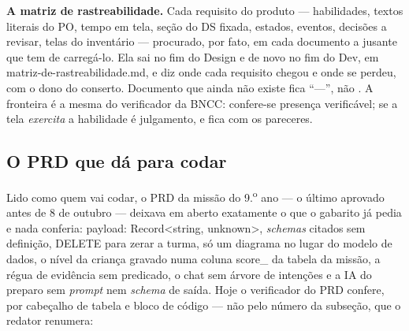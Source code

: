 \documentclass[11pt,a4paper]{article}
\newcommand{\cod}[1]{{\ttfamily\small #1}}
\newcommand{\bolinha}[1]{\tikz[baseline=-0.5ex]{\fill[#1] (0,0) circle (0.33em);}}
\newcommand{\statusVermelho}{\bolinha{sinalVermelho}}
\begin{document}
{\sffamily\bfseries\color{unNavy}A matriz de rastreabilidade.} Cada requisito do produto --- habilidades, textos literais do PO, tempo em tela, seção do DS fixada, estados, eventos, decisões a revisar, telas do inventário --- procurado, por fato, em cada documento a jusante que tem de carregá-lo. Ela sai no fim do Design e de novo no fim do Dev, em \cod{matriz-de-rastreabilidade.md}, e diz onde cada requisito chegou e onde se perdeu, com o dono do conserto. Documento que ainda não existe fica ``---'', não \statusVermelho. A fronteira é a mesma do verificador da BNCC: confere-se presença verificável; se a tela \emph{exercita} a habilidade é julgamento, e fica com os pareceres.


\subsection{O PRD que dá para codar}
\label{sec:prdcod}

Lido como quem vai codar, o PRD da missão do 9.\textsuperscript{o} ano --- o último aprovado antes de 8 de outubro --- deixava em aberto exatamente o que o gabarito já pedia e nada conferia: \cod{payload: Record<string, unknown>}, \emph{schemas} citados sem definição, \cod{DELETE} para zerar a turma, só um diagrama no lugar do modelo de dados, o nível da criança gravado numa coluna \cod{score\_} da tabela da missão, a régua de evidência sem predicado, o chat sem árvore de intenções e a IA do preparo sem \emph{prompt} nem \emph{schema} de saída. Hoje o verificador do PRD confere, por cabeçalho de tabela e bloco de código --- não pelo número da subseção, que o redator renumera:
\end{document}
